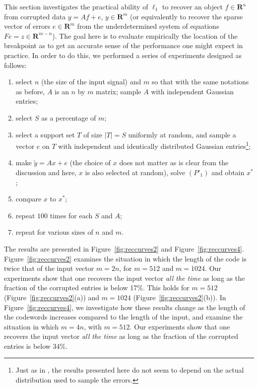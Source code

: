 \documentclass[11pt]{article}
\def\R{{{\mathbf{R}}}} %
\newcommand{\<}{\langle}
\renewcommand{\>}{\rangle}
\numberwithin{equation}{section}
\begin{document}
This section investigates the practical ability of $\ell_1$ to recover
an object $f \in \R^n$ from corrupted data $y = A f + e$, $y \in \R^m$
(or equivalently to recover the sparse vector of errors $e \in \R^m$
from the underdetermined system of equations $F e = z \in \R^{m-n}$).
The goal here is to evaluate empirically the location of the
breakpoint as to get an accurate sense of the performance one might
expect in practice. In order to do this, we performed a series of
experiments designed as follows:
\begin{enumerate}
\item select $n$ (the size of the input signal) and $m$ so that with
  the same notations as before, $A$ is an $n$ by $m$ matrix; sample
  $A$ with independent Gaussian entries; 
    
\item select $S$ as a percentage of $m$; %
  
\item select a support set $T$ of size $|T|= S$ uniformly at random,
  and sample a vector $e$ on $T$ with independent and identically
  distributed Gaussian entries\footnote{Just as in \cite{RandomBP},
    the results presented here do not seem to depend on the actual
    distribution used to sample the errors.};
\item make $\tilde y = A x + e$ (the choice of $x$ does not matter as
  is clear from the discussion and here, $x$ is also selected at
  random), solve $(P'_1)$ and obtain $x^*$;
\item compare $x$ to $x^*$;
\item repeat $100$ times for each $S$ and $A$;
\item repeat for various sizes of $n$ and $m$. 
\end{enumerate}

The results are presented in Figure~\ref{fig:reccurves2} and
Figure~\ref{fig:reccurves4}.  Figure~\ref{fig:reccurves2} examines the
situation in which the length of the code is twice that of the input
vector $m = 2n$, for $m = 512$ and $m = 1024$. Our experiments show
that one recovers the input vector {\em all the time} as long as the
fraction of the corrupted entries is below 17\%. This holds for $m =
512$ (Figure~\ref{fig:reccurves2}(a)) and $m = 1024$
(Figure~\ref{fig:reccurves2}(b)).  In Figure~\ref{fig:reccurves4}, we
investigate how these results change as the length of the codewords 
increases compared to the length of the input, and examine the
situation in which $m = 4n$, with $m = 512$.  Our experiments show
that one recovers the input vector {\em all the time} as long as the
fraction of the corrupted entries is below 34\%.
\end{document}
